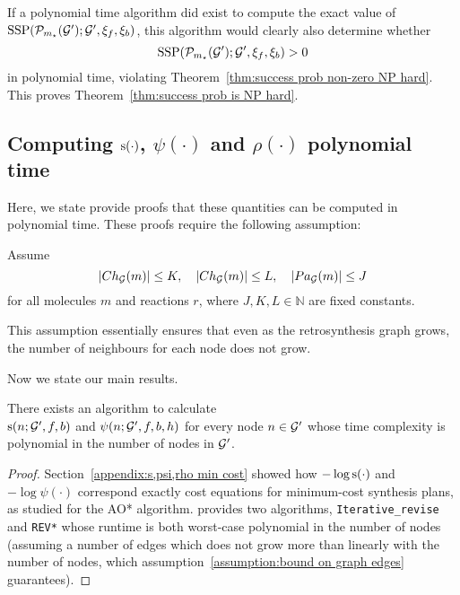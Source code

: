 \begin{corollary}
If a polynomial time algorithm did exist to compute the exact value of
$\mathrm{SSP}(\mathcal{P}_{m_\star}({\mathcal{G}}');{\mathcal{G}}',\xi_f,\xi_b)$,
this algorithm would clearly also determine whether
$$\mathrm{SSP}(\mathcal{P}_{m_\star}({\mathcal{G}}');{\mathcal{G}}',\xi_f,\xi_b)>0$$
in polynomial time,
violating Theorem~\ref{thm:success prob non-zero NP hard}.
This proves Theorem~\ref{thm:success prob is NP hard}.
\end{corollary}

\subsection{
    Computing
    \texorpdfstring{${\textnormal{s}}(\cdot)$, $\psi(\cdot)$ and $\rho(\cdot)$}{s, ψ and ρ}
    polynomial time
}
\label{appendix:proofs:polynomial-dp-updates}

Here, we state provide proofs that these quantities can be computed in polynomial time.
These proofs require the following assumption:
\begin{assumption}
\label{assumption:bound on graph edges}
    Assume 
    \begin{equation*}
      |Ch_{\mathcal{G}}(m)|\leq K,\quad
      |Ch_{\mathcal{G}}(m)|\leq L, \quad
      |Pa_{\mathcal{G}}(m)|\leq J
    \end{equation*}
    for all molecules $m$ and reactions $r$,
    where $J,K,L\in\mathbb N$ are fixed constants.
\end{assumption}
This assumption essentially ensures that even as the retrosynthesis graph grows,
the number of neighbours for each node does not grow.

Now we state our main results.
\begin{lemma}
\label{thm:s and psi in poly time}
    There exists an algorithm to calculate \\
    ${\textnormal{s}}(n;{\mathcal{G}}',f,b)$ and $\psi(n;{\mathcal{G}}',f,b,h)$
    for every node $n\in{\mathcal{G}}'$ whose time
    complexity is polynomial in the number of nodes in ${\mathcal{G}}'$.
\end{lemma}
\begin{proof}
    Section~\ref{appendix:s,psi,rho min cost}
    showed how $-\log{{\textnormal{s}}(\cdot)}$
    and $-\log{\psi(\cdot)}$
    correspond exactly cost equations for minimum-cost synthesis plans,
    as studied for the AO* algorithm.
    \citep{chakrabarti1994algorithms} provides two algorithms,
    \texttt{Iterative\_revise}
    and \texttt{REV*}
    whose runtime is both worst-case polynomial in the number of nodes
    (assuming a number of edges which does not grow more than linearly
    with the number of nodes,
    which assumption~\ref{assumption:bound on graph edges} guarantees).
\end{proof}

